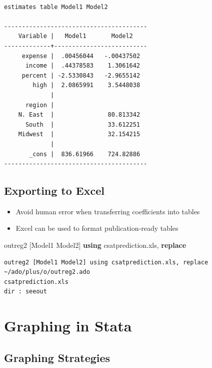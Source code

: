 \documentclass[
]{book}
\newenvironment{Shaded}{\begin{snugshade}}{\end{snugshade}}
\newcommand{\KeywordTok}[1]{\textcolor[rgb]{0.13,0.29,0.53}{\textbf{#1}}}
\newcommand{\NormalTok}[1]{#1}
\providecommand{\tightlist}{%
  \setlength{\itemsep}{0pt}\setlength{\parskip}{0pt}}
\begin{document}
\begin{verbatim}

estimates table Model1 Model2

----------------------------------------
    Variable |   Model1       Model2    
-------------+--------------------------
     expense |  .00456044   -.00437502  
      income |  .44378583    1.3061642  
     percent | -2.5330843   -2.9655142  
        high |  2.0865991    3.5448038  
             |
      region |
    N. East  |               80.813342  
      South  |               33.612251  
    Midwest  |               32.154215  
             |
       _cons |  836.61966    724.82886  
----------------------------------------
\end{verbatim}

\hypertarget{exporting-to-excel}{%
\subsection{Exporting to Excel}\label{exporting-to-excel}}

\begin{itemize}
\tightlist
\item
  Avoid human error when transferring coefficients into tables
\item
  Excel can be used to format publication-ready tables
\end{itemize}

\begin{Shaded}
\begin{Highlighting}[]
\NormalTok{  outreg2 [Model1 Model2] }\KeywordTok{using}\NormalTok{ csatprediction.xls, }\KeywordTok{replace}
\end{Highlighting}
\end{Shaded}

\begin{verbatim}
outreg2 [Model1 Model2] using csatprediction.xls, replace
~/ado/plus/o/outreg2.ado
csatprediction.xls
dir : seeout
\end{verbatim}

\hypertarget{graphing-in-stata}{%
\section{Graphing in Stata}\label{graphing-in-stata}}

\hypertarget{graphing-strategies}{%
\subsection{Graphing Strategies}\label{graphing-strategies}}
\end{document}
